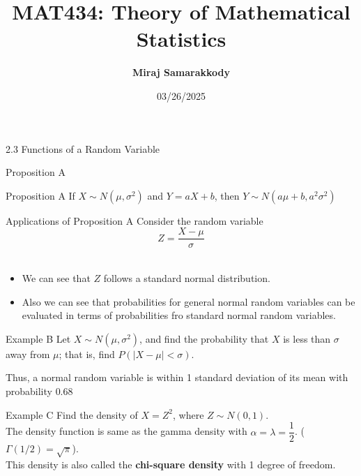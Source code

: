 \documentclass{beamer}
\title{MAT434: Theory of Mathematical Statistics}
\author{\textbf{Miraj Samarakkody}}
\institute{Tougaloo College}
\date{03/26/2025}
\begin{document}
\begin{frame}
    \titlepage
\end{frame}



\begin{frame}{}
    \begin{center}
        \Huge{2.3 Functions of a Random Variable}
    \end{center}

\end{frame}





\begin{frame}{Proposition A}
\begin{block}{Proposition A}    
If \(X \sim N(\mu, \sigma^2)\) and \(Y=aX+b\), then \(Y\sim N(a\mu +b, a^2\sigma^2)\)
\end{block}
\end{frame}

\begin{frame}{Applications of Proposition A}
Consider the random variable \[Z=\dfrac{X-\mu}{\sigma}\]\\ \pause 


\begin{itemize}
    \item We can see that \(Z\) follows a standard normal distribution. \\\pause


    \item Also we can see that probabilities for general normal random variables can be evaluated in terms of probabilities fro standard normal random variables. 
\end{itemize} 
\end{frame}




\begin{frame}{Example B}
Let \(X \sim N (\mu, \sigma^2)\), and find the probability that \(X\) is less than \(\sigma\) away from \(\mu\); that is, find \(P(|X-\mu|< \sigma)\).\\ \pause
\vspace{0.2in}

Thus, a normal random variable is within 1 standard deviation of its mean with probability \(0.68\)
\end{frame}

\begin{frame}{Example C}
    Find the density of \(X=Z^2\), where \(Z \sim N(0,1)\). \\
    \pause
    \vspace{0.2in}
    The density function is same as the gamma density with \(\alpha = \lambda = \dfrac{1}{2}\). (\(\Gamma(1/2)= \sqrt{\pi}\)).\\
    This density is also called the \textbf{chi-square density} with 1 degree of freedom. 
\end{frame}
\end{document}
